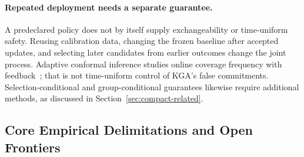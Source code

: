 \paragraph{Repeated deployment needs a separate guarantee.}
A predeclared policy does not by itself supply exchangeability or time-uniform safety.
Reusing calibration data, changing the frozen baseline after accepted updates, and selecting later
candidates from earlier outcomes change the joint process. Adaptive conformal inference studies
online coverage frequency with feedback~\cite{gibbs2021adaptive}; that is not time-uniform control
of KGA's false commitments. Selection-conditional and group-conditional guarantees likewise require
additional methods, as discussed in Section~\ref{sec:compact-related}.

\subsection{Core Empirical Delimitations and Open Frontiers}
\label{sec:empirical-delimitations}

